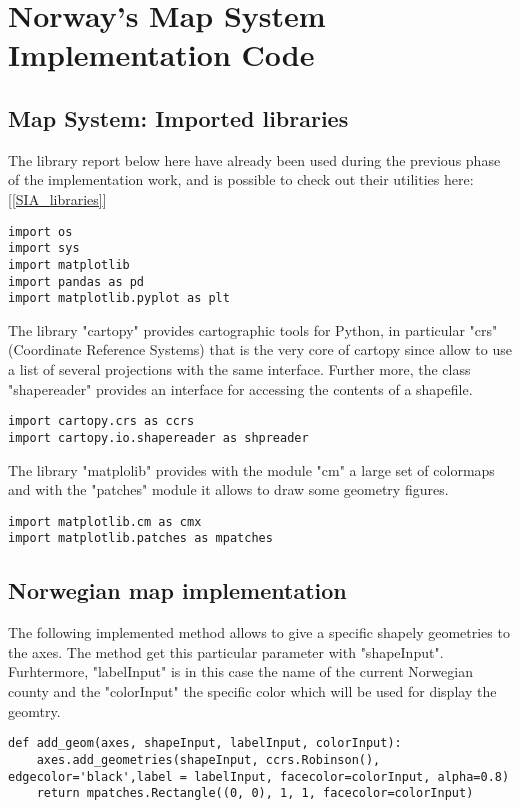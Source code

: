 \chapter{Norway's Map System Implementation Code}
\label{Map_System}
\section{Map System: Imported libraries}
\label{Map_libraries}
The library report below here have already been used during the previous phase of the implementation work, and is possible to check out their utilities here: [\ref{SIA_libraries}]
\begin{lstlisting}
import os
import sys
import matplotlib
import pandas as pd
import matplotlib.pyplot as plt
\end{lstlisting}

The library "cartopy" provides cartographic tools for Python, in particular "crs" (Coordinate Reference Systems) that is the very core of cartopy since allow to use a list of several projections with the same interface. Further more, the class "shapereader" provides an interface for accessing the contents of a shapefile.
\begin{lstlisting}
import cartopy.crs as ccrs
import cartopy.io.shapereader as shpreader
\end{lstlisting}

The library "matplolib" provides with the module "cm" a large set of colormaps and with the "patches" module it allows to draw some geometry figures.
\begin{lstlisting}
import matplotlib.cm as cmx
import matplotlib.patches as mpatches
\end{lstlisting}

\section{Norwegian map implementation}
\label{Map_system_implementation}
The following implemented method allows to give a specific shapely geometries to the axes. The method get this particular parameter with "shapeInput". Furhtermore, "labelInput" is in this case the name of the current Norwegian county and the "colorInput" the specific color which will be used for display the geomtry.
\begin{lstlisting}
def add_geom(axes, shapeInput, labelInput, colorInput):
	axes.add_geometries(shapeInput, ccrs.Robinson(), edgecolor='black',label = labelInput, facecolor=colorInput, alpha=0.8)
	return mpatches.Rectangle((0, 0), 1, 1, facecolor=colorInput)
\end{lstlisting}

